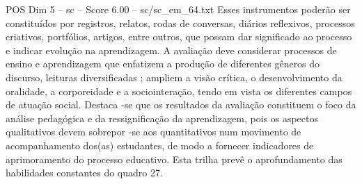 \begin{textsample}{POS Dim 5 – sc – Score 6.00 – sc/sc\_em\_64.txt}
Esses instrumentos poderão ser constituídos por registros, relatos, rodas de conversas, diários reflexivos, processos criativos, portfólios, artigos, entre outros, que possam dar significado ao processo e indicar evolução na aprendizagem.
A avaliação deve considerar processos de ensino e aprendizagem que enfatizem a produção de diferentes gêneros do discurso, leituras diversificadas ; ampliem a visão crítica, o desenvolvimento da oralidade, a corporeidade e a sociointeração, tendo em vista os diferentes campos de atuação social.
Destaca -se que os resultados da avaliação constituem o foco da análise pedagógica e da ressignificação da aprendizagem, pois os aspectos qualitativos devem sobrepor -se aos quantitativos num movimento de acompanhamento dos(as) estudantes, de modo a fornecer indicadores de aprimoramento do processo educativo.
Esta trilha prevê o aprofundamento das habilidades constantes do quadro 27.

\end{textsample}
